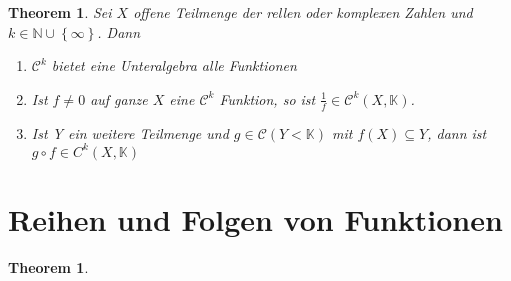 \documentclass[prb,12pt]{revtex4-2}
\newtheorem{Theorem}{Theorem}
\newtheorem{Proposition}{Theorem}
\theoremstyle{definition}
\theoremstyle{definition}
\begin{document}
\begin{Proposition}
	Sei $X$ offene Teilmenge der rellen oder komplexen Zahlen und $k\in\mathbb{N}\cup \left\{ \infty \right\} $. Dann
	\begin{enumerate}
		\item $\mathcal{C}^k$ bietet eine Unteralgebra alle Funktionen
		\item Ist $f\neq 0$ auf ganze $X$ eine $\mathcal{C}^k$ Funktion, so ist $\frac{1}{f}\in \mathcal{C}^k (X, \mathbb{K})$.
		\item Ist Y ein weitere Teilmenge und $g\in \mathcal{C}(Y< \mathbb{K})$ mit $f(X)\subseteq Y$, dann ist $g\circ f \in C^k(X, \mathbb{K})$
	\end{enumerate}
\end{Proposition}
\section{Reihen und Folgen von Funktionen}
\begin{Theorem}
	
\end{Theorem}
\end{document}
